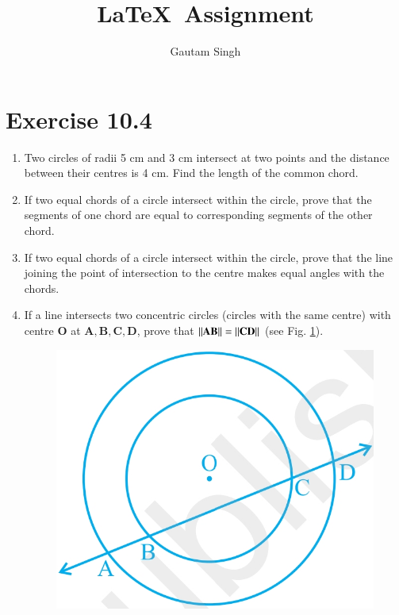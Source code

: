 \documentclass[journal,12pt,twocolumn]{IEEEtran}
\let\vec\mathbf
\begin{document}
\vspace{3cm}
\title{\LaTeX\ Assignment}
\author{Gautam Singh}
\maketitle
\tableofcontents
\bigskip
\section{Exercise 10.4}
\begin{enumerate}
\item Two circles of radii 5 cm and 3 cm intersect at two points and the
distance between their centres is 4 cm. Find the length of the common chord.

\item If two equal chords of a circle intersect within the circle, prove 
that the segments of one chord are equal to corresponding segments of the other 
chord.

\item If two equal chords of a circle intersect within the circle, prove 
that the line joining the point of intersection to the centre makes equal 
angles with the chords.

\item If a line intersects two concentric circles (circles with the same 
centre) with centre $\vec{O}$ at $\vec{A}, \vec{B}, \vec{C}, \vec{D}$, prove that $\norm{\vec{AB}} = \norm{\vec{CD}}$ (see Fig. \ref{fig1}).

\begin{figure}[!ht]
    \centering
    \includegraphics[width=\columnwidth]{figs/fig1.jpg}
    \caption{}
    \label{fig1}
\end{figure}


\end{enumerate}
\end{document}
